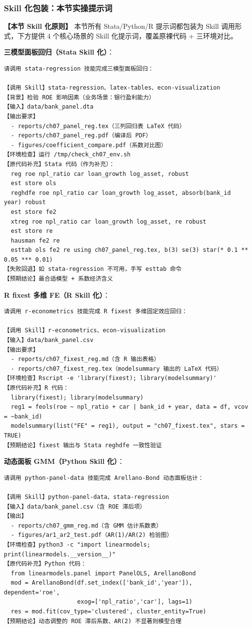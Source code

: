 \subsubsection{Skill 化包装：本节实操提示词}

\textbf{【本节 Skill 化原则】} 本节所有 Stata/Python/R 提示词都包装为 Skill 调用形式，下方提供 4 个核心场景的 Skill 化提示词，覆盖原裸代码 + 三环境对比。

\textbf{三模型面板回归（Stata Skill 化）}：
\begin{lstlisting}
请调用 stata-regression 技能完成三模型面板回归：

【调用 Skill】stata-regression、latex-tables、econ-visualization
【背景】检验 ROE 影响因素（业务场景：银行盈利能力）
【输入】data/bank_panel.dta
【输出要求】
  - reports/ch07_panel_reg.tex（三列回归表 LaTeX 代码）
  - reports/ch07_panel_reg.pdf（编译后 PDF）
  - figures/coefficient_compare.pdf（系数对比图）
【环境检查】运行 /tmp/check_ch07_env.sh
【原代码补充】Stata 代码（作为补充）：
  reg roe npl_ratio car loan_growth log_asset, robust
  est store ols
  reghdfe roe npl_ratio car loan_growth log_asset, absorb(bank_id year) robust
  est store fe2
  xtreg roe npl_ratio car loan_growth log_asset, re robust
  est store re
  hausman fe2 re
  esttab ols fe2 re using ch07_panel_reg.tex, b(3) se(3) star(* 0.1 ** 0.05 *** 0.01)
【失败回退】如 stata-regression 不可用，手写 esttab 命令
【预期结论】最合适模型 + 系数经济含义
\end{lstlisting}

\textbf{R fixest 多维 FE（R Skill 化）}：
\begin{lstlisting}
请调用 r-econometrics 技能完成 R fixest 多维固定效应回归：

【调用 Skill】r-econometrics、econ-visualization
【输入】data/bank_panel.csv
【输出要求】
  - reports/ch07_fixest_reg.md（含 R 输出表格）
  - reports/ch07_fixest_reg.tex（modelsummary 输出的 LaTeX 代码）
【环境检查】Rscript -e 'library(fixest); library(modelsummary)'
【原代码补充】R 代码：
  library(fixest); library(modelsummary)
  reg1 = feols(roe ~ npl_ratio + car | bank_id + year, data = df, vcov = ~bank_id)
  modelsummary(list("FE" = reg1), output = "ch07_fixest.tex", stars = TRUE)
【预期结论】fixest 输出与 Stata reghdfe 一致性验证
\end{lstlisting}

\textbf{动态面板 GMM（Python Skill 化）}：
\begin{lstlisting}
请调用 python-panel-data 技能完成 Arellano-Bond 动态面板估计：

【调用 Skill】python-panel-data、stata-regression
【输入】data/bank_panel.csv（含 ROE 滞后项）
【输出】
  - reports/ch07_gmm_reg.md（含 GMM 估计系数表）
  - figures/ar1_ar2_test.pdf（AR(1)/AR(2) 检验图）
【环境检查】python3 -c "import linearmodels; print(linearmodels.__version__)"
【原代码补充】Python 代码：
  from linearmodels.panel import PanelOLS, ArellanoBond
  mod = ArellanoBond(df.set_index(['bank_id','year']), dependent='roe',
                     exog=['npl_ratio','car'], lags=1)
  res = mod.fit(cov_type='clustered', cluster_entity=True)
【预期结论】动态调整的 ROE 滞后系数、AR(2) 不显著则模型合理
\end{lstlisting}

